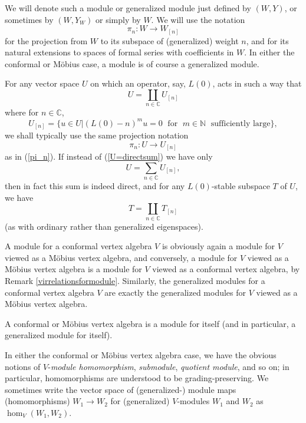 \documentclass[12pt]{article}
\begin{document}
We will denote such a module or generalized module just defined by
$(W,Y)$, or sometimes by $(W,Y_W)$ or simply by $W$. We will use the
notation
\begin{equation}\label{pi_n}
\pi_n: W\to W_{[n]}
\end{equation}
for the projection {}from $W$ to its subspace of (generalized) weight
$n$, and for its natural extensions to spaces of formal series with
coefficients in $W$. In either the conformal or M\"obius case, a
module is of course a generalized module.

\begin{rema}\label{generalizedeigenspacedecomp}
{\rm For any vector space $U$ on which an operator, say, $L(0)$, acts
in such a way that
\begin{equation}\label{U=directsum}
U=\coprod_{n\in{\mathbb C}} U_{[n]}
\end{equation}
where for $n\in {\mathbb C}$,
\[
U_{[n]} = \{ u \in U | (L(0)-n)^m u=0 \;\mbox{ for }\;m\in {\mathbb
N}\;\mbox{ sufficiently large} \},
\]
we shall typically use the same projection notation
\begin{equation}
\pi_n: U\to U_{[n]}
\end{equation}
as in (\ref{pi_n}).  If instead of (\ref{U=directsum}) we have only
\[
U=\sum_{n\in{\mathbb C}} U_{[n]},
\]
then in fact this sum is indeed direct, and for any $L(0)$-stable
subspace $T$ of $U$, we have
\[
T=\coprod_{n\in{\mathbb C}} T_{[n]}
\]
(as with ordinary rather than generalized eigenspaces).}
\end{rema}

\begin{rema}\label{modulesaremodules}{\rm
A module for a conformal vertex algebra $V$ is obviously again a
module for $V$ viewed as a M\"obius vertex algebra, and conversely, a
module for $V$ viewed as a M\"obius vertex algebra is a module for $V$
viewed as a conformal vertex algebra, by Remark
\ref{virrelationsformodule}.  Similarly, the generalized modules for a
conformal vertex algebra $V$ are exactly the generalized modules for
$V$ viewed as a M\"obius vertex algebra.}
\end{rema}

\begin{rema}{\rm
A conformal or M\"obius vertex algebra is a module for itself (and 
in particular, a generalized module for itself).}
\end{rema}

\begin{rema}{\rm
In either the conformal or M\"obius vertex algebra case, we have the
obvious notions of $V$-{\em module homomorphism}, {\em submodule},
{\em quotient module}, and so on; in particular, homomorphisms are
understood to be grading-preserving.  We sometimes write the vector
space of (generalized-) module maps (homomorphisms) $W_1 \to W_2$ for
(generalized) $V$-modules $W_1$ and $W_2$ as $\hom_{V}(W_1,W_2)$.  }
\end{rema}
\end{document}
